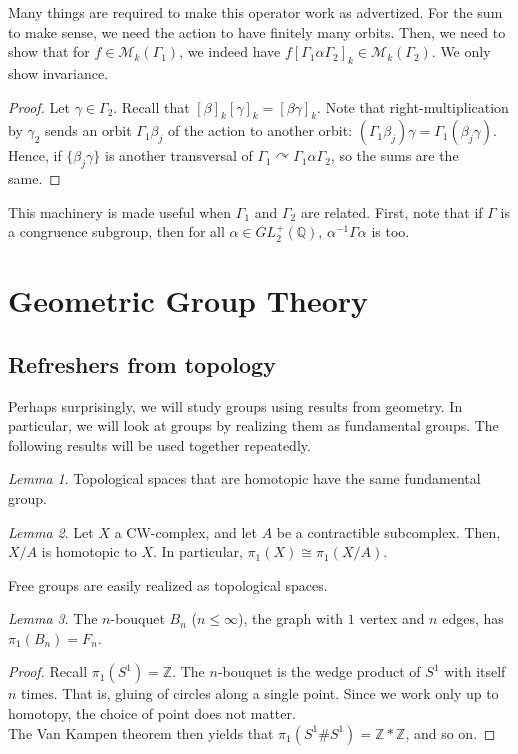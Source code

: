 \documentclass[11pt]{article}
\theoremstyle{definition}
\theoremstyle{example}
\theoremstyle{remark}
\theoremstyle{lemma}
\newtheorem{lemma}{Lemma}[section]
\theoremstyle{proposition}
\theoremstyle{Problem}
\theoremstyle{Solution}
\theoremstyle{theorem}
\begin{document}
Many things are required to make this operator work as advertized. For the sum to make sense, we need the action to have finitely many orbits. Then, we need to show that for $f\in\mathcal{M}_k(\Gamma_1)$, we indeed have $ f[\Gamma_1\alpha\Gamma_2]_k\in \mathcal{M}_k(\Gamma_2)$. We only show invariance.\\
\begin{proof}
Let $\gamma\in \Gamma_2$. Recall that $[\beta]_k[\gamma]_k = [\beta\gamma]_k$. 
Note that right-multiplication by $\gamma_2$ sends an orbit $\Gamma_1\beta_j$ of the action to another orbit: $(\Gamma_1\beta_j)\gamma= \Gamma_1(\beta_j\gamma)$. Hence, if $\{\beta_j \gamma\}$ is another transversal of $\Gamma_1\curvearrowright\Gamma_1\alpha\Gamma_2$, so the sums are the same.
\end{proof}

This machinery is made useful when $\Gamma_1$ and $\Gamma_2$ are related. First, note that if $\Gamma$ is a congruence subgroup, then for all $\alpha\in GL_2^+(\mathbb{Q})$,  $\alpha^{-1}\Gamma\alpha$ is too.




\section{Geometric Group Theory}
\subsection{Refreshers from topology}
Perhaps surprisingly, we will study groups using results from geometry. In particular, we will look at groups by realizing them as fundamental groups. The following results will be used together repeatedly.
\begin{lemma}
Topological spaces that are homotopic have the same fundamental group. 
\end{lemma}
\begin{lemma}
Let $X$ a CW-complex, and let $A$ be a contractible subcomplex. Then, $X/A$ is homotopic to $X$. In particular, $\pi_1(X) \cong \pi_1(X/A)$.
\end{lemma}

Free groups are easily realized as topological spaces.
\begin{lemma}
The $n$-bouquet $B_n$ ($n\leq \infty$), the graph with $1$ vertex and $n$ edges, has $\pi_1(B_n) = F_n$.
\end{lemma}
\begin{proof}
Recall $\pi_1(S^1)=\mathbb{Z}$. The $n$-bouquet is the wedge product of $S^1$ with itself $n$ times. That is, gluing of circles along a single point. Since we work only up to homotopy, the choice of point does not matter.\\
The Van Kampen theorem then yields that $\pi_1(S^1\# S^1) = \mathbb{Z}*\mathbb{Z}$, and so on.
\end{proof}
\end{document}
